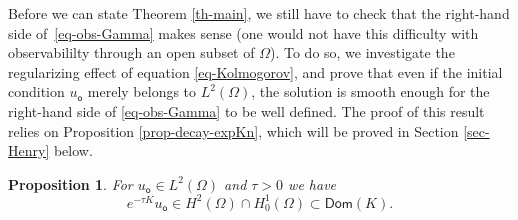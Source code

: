 \documentclass[JEP,XML,SOM,Unicode]{cedram}
\theoremstyle{plain}
\newtheorem{proposition}[theorem]{Proposition}
\theoremstyle{definition}
\newcommand{\1}{\mathds 1}
\newcommand{\Dom}{\mathsf{Dom}}
\let\O\Omega
\newcommand{\uo}{u_{\mathsf{o}}}
\begin{document}
Before we can state Theorem \ref{th-main}, we still have to check that the right-hand side of~\eqref{eq-obs-Gamma} makes sense (one would not have this difficulty with observabililty through an open subset of $\O$).
To do so, we investigate the regularizing effect of equation \eqref{eq-Kolmogorov}, and prove that
even if the initial condition $\uo$ merely belongs to $L^2(\O)$, the solution is smooth enough for the right-hand side
of \eqref{eq-obs-Gamma} to be well defined.
The proof of this result relies on Proposition \ref{prop-decay-expKn}, which will be proved in Section \ref{sec-Henry} below.

\begin{proposition} \label{prop-regularite}
For $\uo \in L^2(\O)$ and $\tau > 0$ we have
\[
e^{-\tau K} \uo \in H^2(\O) \cap H^1_0(\O) \subset \Dom(K).
\]
\end{proposition}
\end{document}
